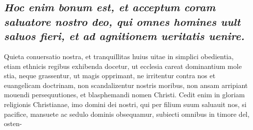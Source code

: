 \documentclass{article}
\begin{document}
\begin{pages}
{}
\subsection*{\textit{Hoc enim bonum est, et acceptum coram saluatore nostro deo, qui omnes homines uult saluos fieri, et ad agnitionem ueritatis uenire. }}\pstart Quieta conuersatio nostra, et tranquillitas huius uitae in simplici obedientia, etiam ethnicis regibus exhibenda docetur, ut ecclesia careat dominantium mole stia, neque grassentur, ut magis opprimant, ne irritentur contra nos et euangelicam doctrinam, non scandalizentur nostris moribus, non ansam arripiant mouendi persequutiones, et blasphemandi nomen Christi. Cedit enim in gloriam religionis Christianae, imo domini dei nostri, qui per filium suum saluauit nos, si pacifice, mansuete ac sedulo dominis obsequamur, subiecti omnibus in timore del, osten-  \pend

\end{pages}
\end{document}
